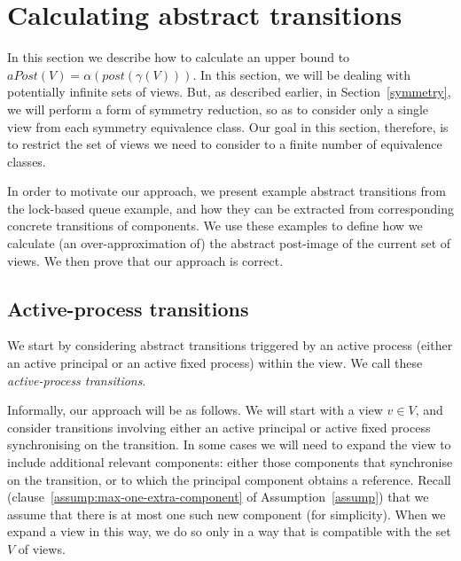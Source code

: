 



\section{Calculating abstract transitions}
\label{sec:transitions}

In this section we describe how to calculate an upper bound to $aPost(V) =
\alpha(post(\gamma(V)))$.  In this section, we will be dealing with
potentially infinite sets of views.  But, as described earlier, in
Section~\ref{symmetry}, we will perform a form of symmetry reduction, so as to
consider only a single view from each symmetry equivalence class.  Our goal in
this section, therefore, is to restrict the set of views we need to consider
to a finite number of equivalence classes.


%
In order to motivate our approach, we present example abstract transitions
from the lock-based queue example, and how they can be extracted from
corresponding concrete transitions of components.  We use these examples to
define how we calculate (an over-approximation of) the abstract post-image of
the current set of views.  We then prove that our approach is correct.

\subsection{Active-process transitions}

We start by considering abstract transitions triggered by an active process
(either an active principal or an active fixed process) within the view.  We
call these \emph{active-process transitions}.

Informally, our approach will be as follows.  We will start with a view $v \in
V$, and consider transitions involving either an active principal or active
fixed process synchronising on the transition.
In some cases we will need to expand the view to include additional relevant
components: either those components that synchronise on the transition, or to
which the principal component obtains a reference.  Recall
(clause~\ref{assump:max-one-extra-component} of Assumption~\ref{assump}) that
we assume that there is at most one such new component (for simplicity).  When
we expand a view in this way, we do so only in a way that is compatible with
the set $V$ of views.

